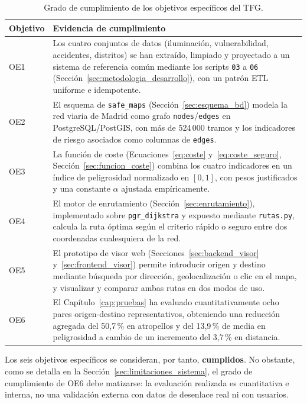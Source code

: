 \begin{table}[htbp]
\centering
\small
\begin{tabular}{p{1.6cm}p{10.5cm}}
\hline
\textbf{Objetivo} & \textbf{Evidencia de cumplimiento} \\
\hline
OE1 & Los cuatro conjuntos de datos (iluminación, vulnerabilidad, accidentes, distritos) se han extraído, limpiado y proyectado a un sistema de referencia común mediante los scripts \texttt{03} a \texttt{06} (Sección~\ref{sec:metodologia_desarrollo}), con un patrón ETL uniforme e idempotente. \\
\hline
OE2 & El esquema de \texttt{safe\_maps} (Sección~\ref{sec:esquema_bd}) modela la red viaria de Madrid como grafo \texttt{nodes}/\texttt{edges} en PostgreSQL/PostGIS, con más de 524\,000 tramos y los indicadores de riesgo asociados como columnas de \texttt{edges}. \\
\hline
OE3 & La función de coste (Ecuaciones~\ref{eq:coste} y~\ref{eq:coste_seguro}, Sección~\ref{sec:funcion_coste}) combina los cuatro indicadores en un índice de peligrosidad normalizado en $[0,1]$, con pesos justificados y una constante $\alpha$ ajustada empíricamente. \\
\hline
OE4 & El motor de enrutamiento (Sección~\ref{sec:enrutamiento}), implementado sobre \texttt{pgr\_dijkstra} y expuesto mediante \texttt{rutas.py}, calcula la ruta óptima según el criterio rápido o seguro entre dos coordenadas cualesquiera de la red. \\
\hline
OE5 & El prototipo de visor web (Secciones~\ref{sec:backend_visor} y~\ref{sec:frontend_visor}) permite introducir origen y destino mediante búsqueda por dirección, geolocalización o clic en el mapa, y visualizar y comparar ambas rutas en dos modos de uso. \\
\hline
OE6 & El Capítulo~\ref{cap:pruebas} ha evaluado cuantitativamente ocho pares origen-destino representativos, obteniendo una reducción agregada del 50,7\,\% en atropellos y del 13,9\,\% de media en peligrosidad a cambio de un incremento del 3,7\,\% en distancia. \\
\hline
\end{tabular}
\caption{Grado de cumplimiento de los objetivos específicos del TFG.}
\label{tab:cumplimiento_oe}
\end{table}

Los seis objetivos específicos se consideran, por tanto, \textbf{cumplidos}. No obstante, como se detalla en la Sección~\ref{sec:limitaciones_sistema}, el grado de cumplimiento de OE6 debe matizarse: la evaluación realizada es cuantitativa e interna, no una validación externa con datos de desenlace real ni con usuarios.

